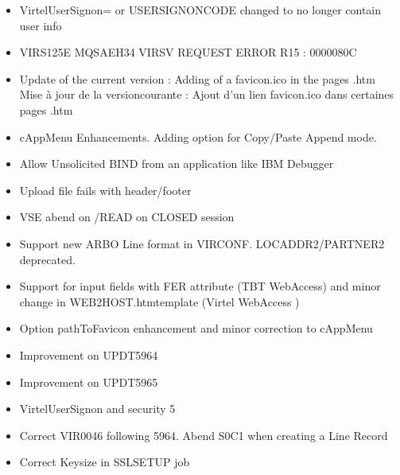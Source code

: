 \documentclass[letterpaper,10pt,english]{sphinxmanual}
\begin{document}
\begin{itemize}
\item {} 
 VirtelUserSignon= or USER\sphinxhyphen{}SIGNON\sphinxhyphen{}CODE changed to no longer contain user info

\item {} 
 VIRS125E MQSAEH34 VIRSV REQUEST ERROR \sphinxhyphen{} R15 : 0000080C

\item {} 
 Update of the current version : Adding of a favicon.ico in the pages .htm \sphinxhyphen{} Mise à jour de la versioncourante : Ajout d’un lien favicon.ico dans certaines pages .htm

\item {} 
 cAppMenu Enhancements. Adding option for Copy/Paste Append mode.

\item {} 
 Allow Unsolicited BIND from an application like IBM Debugger

\item {} 
 Upload file fails with header/footer

\item {} 
 VSE abend on /READ on CLOSED session

\item {} 
 Support new ARBO Line format in VIRCONF. LOCADDR2/PARTNER2 deprecated.

\item {} 
 Support for input fields with FER attribute (TBT WebAccess) and minor change in WEB2HOST.htmtemplate (Virtel WebAccess )

\item {} 
 Option pathToFavicon enhancement and minor correction to cAppMenu

\item {} 
 Improvement on UPDT5964

\item {} 
 Improvement on UPDT5965

\item {} 
 VirtelUserSignon and security 5

\item {} 
 Correct VIR0046 following 5964. Abend S0C1 when creating a Line Record

\item {} 
 Correct Keysize in SSLSETUP job


\end{itemize}
\end{document}
